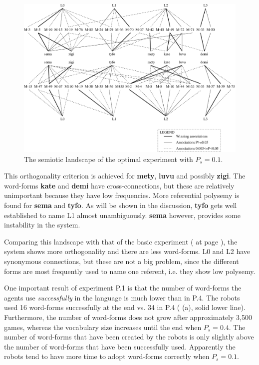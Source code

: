 \begin{figure}[t]
\centerline{\includegraphics[width=12cm]{optimal/semiotic.eps}}
\caption{The semiotic landscape of the optimal experiment with $P_s=0.1$.}
\label{f:opt:semiotic}
\end{figure}

This orthogonality criterion is achieved for {\bf mety}, {\bf luvu} and possibly {\bf zigi}. The word-forms {\bf kate} and {\bf demi} have cross-connections, but these are relatively unimportant because they have low frequencies. More referential polysemy is found for {\bf sema} and {\bf tyfo}. As will be shown in the discussion, {\bf tyfo} gets well established to name L1 almost unambiguously. {\bf sema} however, provides some instability in the system. 

Comparing this landscape with that of the basic experiment ( at page \pageref{f:st:semiotic}), the system shows more orthogonality and there are less word-forms. L0 and L2 have synonymous connections, but these are not a big problem, since the different forms are most frequently used to name one referent, i.e. they show low polysemy.


One important result of experiment P.1 is that the number of word-forms the agents use {\em successfully} in the language is much lower than in P.4. The robots used 16 word-forms successfully at the end vs. 34 in P.4 ( (a), solid lower line). Furthermore, the number of word-forms does not grow after approximately 3,500 games, whereas the vocabulary size increases until the end when $P_s=0.4$. The number of word-forms that have been created by the robots is only slightly above the number of word-forms that have been successfully used. Apparently the robots tend to have more time to adopt word-forms correctly when $P_s=0.1$. 


